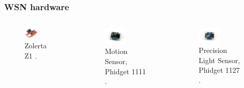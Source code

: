 \documentclass{beamer}
\begin{document}
\begin{frame}
\frametitle{WSN hardware}

	\begin{columns}

	
			\begin{figure}
				\includegraphics[width=0.5\textwidth]{z1.png}
				\caption{Zolerta Z1 \cite{z1}.}
			\end{figure}


			\begin{figure}
				\includegraphics[width=0.5\textwidth]{1111.jpg}
				\caption{Motion Sensor, Phidget 1111 \cite{1111}.}
			\end{figure}

			\begin{figure}
				\includegraphics[width=0.5\textwidth]{1127.jpg}
				\caption{Precision Light Sensor, Phidget 1127 \cite{1111}.}
			\end{figure}

	\end{columns}

\end{frame}
\end{document}
